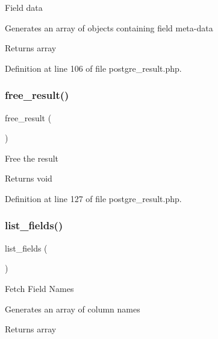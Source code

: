Field data

Generates an array of objects containing field meta-\/data

\begin{DoxyReturn}{Returns}
array 
\end{DoxyReturn}


Definition at line 106 of file postgre\+\_\+result.\+php.

\mbox{\label{class_c_i___d_b__postgre__result_aad2d98d6beb3d6095405356c6107b473}} 
\subsubsection{\texorpdfstring{free\_result()}{free\_result()}}
{\footnotesize\ttfamily free\+\_\+result (\begin{DoxyParamCaption}{ }\end{DoxyParamCaption})}

Free the result

\begin{DoxyReturn}{Returns}
void 
\end{DoxyReturn}


Definition at line 127 of file postgre\+\_\+result.\+php.

\mbox{\label{class_c_i___d_b__postgre__result_a50b54eb4ea7cfd039740f532988ea776}} 
\subsubsection{\texorpdfstring{list\_fields()}{list\_fields()}}
{\footnotesize\ttfamily list\+\_\+fields (\begin{DoxyParamCaption}{ }\end{DoxyParamCaption})}

Fetch Field Names

Generates an array of column names

\begin{DoxyReturn}{Returns}
array 
\end{DoxyReturn}


